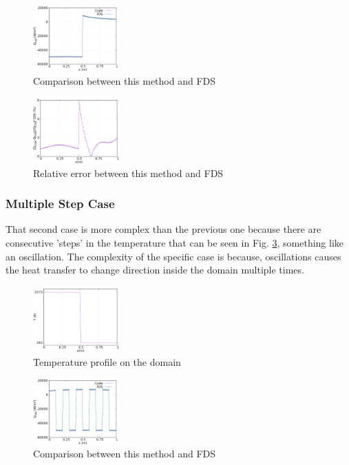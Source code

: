 \documentclass{warpdoc}
\begin{document}
\begin{figure}[!h]
\centering
\includegraphics[width=0.3\textwidth]{2000-20step.png}
\caption{Comparison between this method and FDS}
\label{fig:stepres}
\end{figure}

\begin{figure}[!h]
\centering
\includegraphics[width=0.3\textwidth]{2000-20step_err.png}
\caption{Relative error between this method and FDS}
\label{fig:steprelerr}
\end{figure}

\subsubsection{Multiple Step Case}
That second case is more complex than the previous one because there are consecutive 'steps' in the temperature that can be seen in Fig. \ref{fig:steptemp2}, something like an oscillation. The complexity of the specific case is because, oscillations causes the heat transfer to change direction inside the domain multiple times.
\begin{figure}[!h]
\centering
\includegraphics[width=0.3\textwidth]{2000-20step_temp.png}
\caption{Temperature profile on the domain}
\label{fig:steptemp2}
\end{figure}

\begin{figure}[!h]
\centering
\includegraphics[width=0.3\textwidth]{2000-20mult.png}
\caption{Comparison between this method and FDS}
\label{fig:stepres2}
\end{figure}
\end{document}
